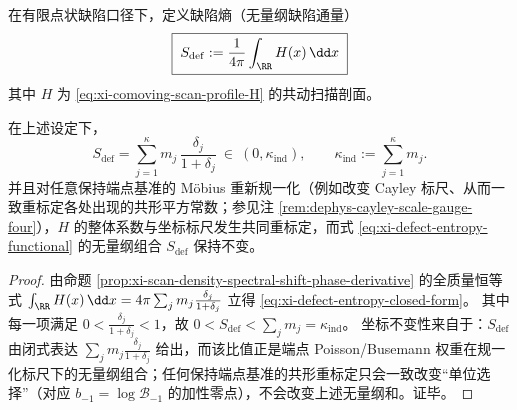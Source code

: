 \begin{definition}\label{def:xi-defect-entropy-functional}
在有限点状缺陷口径下，定义缺陷熵（无量纲缺陷通量）
\begin{equation}\label{eq:xi-defect-entropy-functional}
\boxed{\;
S_{\mathrm{def}}
:=\frac{1}{4\pi}\int_{\RR}H(x)\,\dd x\;}
\end{equation}
其中 \(H\) 为 \eqref{eq:xi-comoving-scan-profile-H} 的共动扫描剖面。
\end{definition}

\begin{proposition}[缺陷熵的闭式表达与坐标不变性]\label{prop:xi-defect-entropy-closed-form-invariant}
在上述设定下，
\begin{equation}\label{eq:xi-defect-entropy-closed-form}
\boxed{\;
S_{\mathrm{def}}
=\sum_{j=1}^{\kappa}m_j\,\frac{\delta_j}{1+\delta_j}\ \in\ (0,\kappa_{\mathrm{ind}}),\qquad
\kappa_{\mathrm{ind}}:=\sum_{j=1}^{\kappa}m_j.\;}
\end{equation}
并且对任意保持端点基准的 Möbius 重新规一化（例如改变 Cayley 标尺、从而一致重标定各处出现的共形平方常数；参见注 \ref{rem:dephys-cayley-scale-gauge-four}），\(H\) 的整体系数与坐标标尺发生共同重标定，而式 \eqref{eq:xi-defect-entropy-functional} 的无量纲组合 \(S_{\mathrm{def}}\) 保持不变。
\end{proposition}

\begin{proof}
由命题 \ref{prop:xi-scan-density-spectral-shift-phase-derivative} 的全质量恒等式
\(
\int_{\RR}H(x)\,\dd x
=4\pi\sum_{j}m_j\frac{\delta_j}{1+\delta_j}
\)
立得 \eqref{eq:xi-defect-entropy-closed-form}。
其中每一项满足 \(0<\frac{\delta_j}{1+\delta_j}<1\)，故 \(0<S_{\mathrm{def}}<\sum_j m_j=\kappa_{\mathrm{ind}}\)。
坐标不变性来自于：\(S_{\mathrm{def}}\) 由闭式表达 \(\sum_j m_j\frac{\delta_j}{1+\delta_j}\) 给出，而该比值正是端点 Poisson/Busemann 权重在规一化标尺下的无量纲组合；任何保持端点基准的共形重标定只会一致改变“单位选择”（对应 \(b_{-1}=\log\mathcal{B}_{-1}\) 的加性零点），不会改变上述无量纲和。证毕。
\end{proof}

